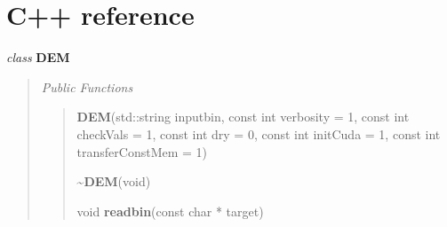 \documentclass[letterpaper,10pt,english]{sphinxmanual}
\begin{document}
\section{C++ reference}
\label{sphere_internals:c-reference}\label{sphere_internals:project0classDEM}\label{sphere_internals:project0classDEM}
\begin{DUlineblock}{0em}
\item[] \emph{class} \textbf{DEM}
\end{DUlineblock}
\begin{quote}




\emph{Public Functions}\begin{quote}

\label{sphere_internals:project0classDEM_1a3cd6355aefc172c712f1c91f4ffc36f2}\label{sphere_internals:project0classDEM_1a3cd6355aefc172c712f1c91f4ffc36f2}
\begin{DUlineblock}{0em}
\item[]  \textbf{DEM}(std::string inputbin, const int verbosity = 1, const int checkVals = 1, const int dry = 0, const int initCuda = 1, const int transferConstMem = 1)
\end{DUlineblock}

\begin{quote}






\end{quote}

\label{sphere_internals:project0classDEM_1aa3066aa501f982c2df51f58fb5a91148}\label{sphere_internals:project0classDEM_1aa3066aa501f982c2df51f58fb5a91148}
\begin{DUlineblock}{0em}
\item[]  \textbf{\textasciitilde{}DEM}(void)
\end{DUlineblock}

\begin{quote}






\end{quote}

\label{sphere_internals:project0classDEM_1ac32ef9094b25ee9c35e30f4488491fe2}\label{sphere_internals:project0classDEM_1ac32ef9094b25ee9c35e30f4488491fe2}
\begin{DUlineblock}{0em}
\item[] void \textbf{readbin}(const char * target)
\end{DUlineblock}


\end{quote}
\end{quote}
\end{document}
